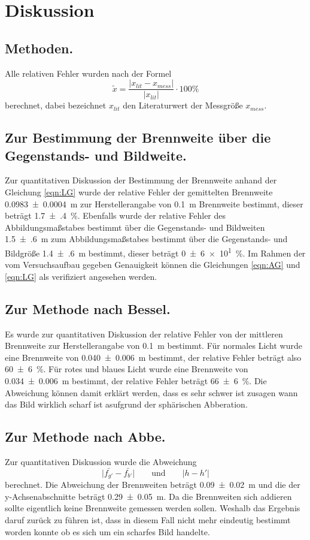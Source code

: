 \section{Diskussion}
\label{sec:Diskussion}
\subsection{Methoden.}
Alle relativen Fehler wurden nach der Formel
\begin{equation*}
  \tilde{x} = \frac{ \lvert x_{lit} - x_{mess} \rvert}{\lvert x_{lit} \rvert}
  \cdot 100 \%
\end{equation*}
berechnet, dabei bezeichnet $x_{lit}$ den Literaturwert der Messgröße $x_{mess}$.

\subsection{Zur Bestimmung der Brennweite über die Gegenstands- und Bildweite.}
Zur quantitativen Diskussion der Bestimmung der Brennweite anhand der Gleichung
\eqref{eqn:LG} wurde der relative Fehler der gemittelten Brennweite
\SI{0.0983(4)}{\meter} zur Herstellerangabe von \SI{0.1}{\meter} Brennweite
bestimmt, dieser beträgt \SI{1.7(4)}{\percent}. Ebenfalls wurde der relative
Fehler des Abbildungsmaßstabes bestimmt über die Gegenstands- und Bildweiten
\SI{1.5(6)}{\meter}
zum Abbildungsmaßstabes bestimmt über die Gegenstands- und Bildgröße
\SI{1.4(6)}{\meter} bestimmt, dieser beträgt \SI{0(6)e1}{\percent}.
Im Rahmen der vom Versuchsaufbau gegeben Genauigkeit können die Gleichungen
\eqref{eqn:AG} und \eqref{eqn:LG} als verifiziert angesehen werden.

\subsection{Zur Methode nach Bessel.}
Es wurde zur quantitativen Diskussion der relative Fehler von
der mittleren Brennweite zur Herstellerangabe von \SI{0.1}{\meter} bestimmt.
Für normales Licht wurde eine Brennweite von \SI{0.040(6)}{\meter} bestimmt,
der relative Fehler beträgt also \SI{60(6)}{\percent}.
Für rotes und blaues Licht wurde eine Brennweite von \SI{0.034(6)}{\meter}
bestimmt, der relative Fehler beträgt \SI{66(6)}{\percent}. Die Abweichung
können damit erklärt werden, dass es sehr schwer ist zusagen wann das
Bild wirklich scharf ist asufgrund der sphärischen Abberation.

\subsection{Zur Methode nach Abbe.}
Zur quantitativen Diskussion wurde die Abweichung
\begin{equation*}
  \lvert \bar{f_{g'}} - \bar{f_{b'}} \rvert
  \qquad \text{und} \qquad
  \lvert h - h' \rvert
\end{equation*}
berechnet. Die Abweichung der Brennweiten beträgt \SI{0.09(2)}{\meter}
und die der y-Achsenabschnitte beträgt \SI{0.29(5)}{\meter}. Da die Brennweiten
sich addieren sollte eigentlich keine Brennweite gemessen werden sollen.
Weshalb das Ergebnis daruf zurück zu führen ist, dass in diesem Fall nicht
mehr eindeutig bestimmt worden konnte ob es sich um ein scharfes Bild
handelte.
